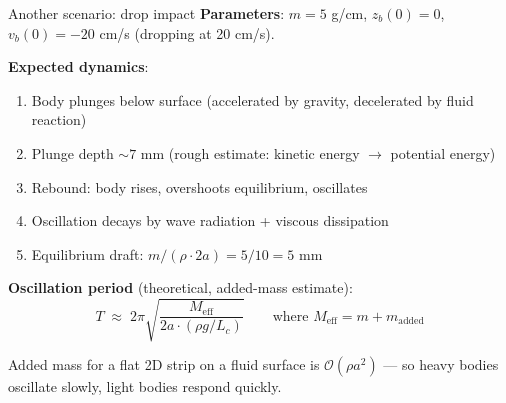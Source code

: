 \documentclass[aspectratio=169, 10pt]{beamer}
\newcommand{\Order}{\mathcal{O}}
\begin{document}
\begin{frame}{Another scenario: drop impact}
\textbf{Parameters}: $m = 5$ g/cm, $z_b(0) = 0$, $v_b(0) = -20$ cm/s (dropping at 20 cm/s).

\vspace{0.5em}
\textbf{Expected dynamics}:
\begin{enumerate}
    \item Body plunges below surface (accelerated by gravity, decelerated by fluid reaction)
    \item Plunge depth $\sim 7$ mm (rough estimate: kinetic energy $\to$ potential energy)
    \item Rebound: body rises, overshoots equilibrium, oscillates
    \item Oscillation decays by wave radiation + viscous dissipation
    \item Equilibrium draft: $m/(\rho \cdot 2a) = 5/10 = 5$ mm
\end{enumerate}

\vspace{0.8em}
\textbf{Oscillation period} (theoretical, added-mass estimate):
\[
T \;\approx\; 2\pi\sqrt{\frac{M_{\text{eff}}}{2a \cdot (\rho g / L_c)}}
\qquad\text{where } M_{\text{eff}} = m + m_{\text{added}}
\]

\small Added mass for a flat 2D strip on a fluid surface is $\Order(\rho a^2)$ — so heavy bodies oscillate slowly, light bodies respond quickly.
\end{frame}
\end{document}

